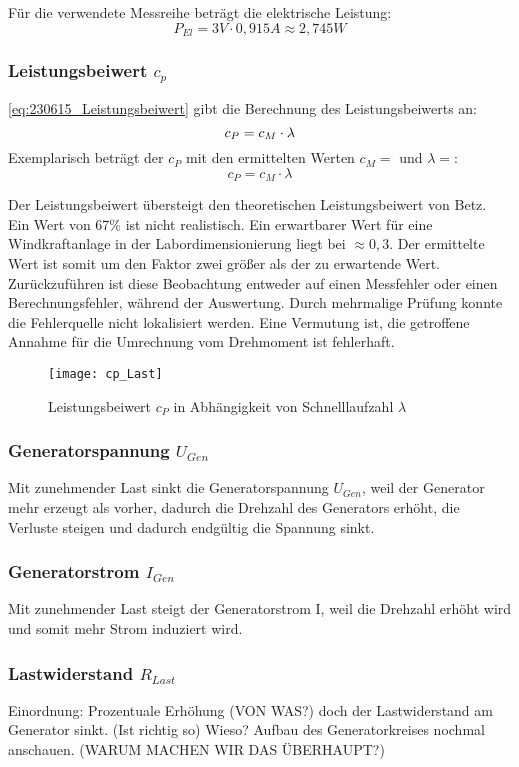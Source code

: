 Für die verwendete Messreihe beträgt die elektrische Leistung:
$$P_{El} = 3V \cdot 0,915A \approx 2,745W$$


\subsubsection*{Leistungsbeiwert $c_p$}
\autoref{eq:230615_Leistungsbeiwert} gibt die Berechnung des Leistungsbeiwerts an:
 \begin{equation}
     \centering
     c_P = c_M \cdot \lambda
     \label{eq:230615_Leistungsbeiwert}
 \end{equation}
Exemplarisch beträgt der $c_P$ mit den ermittelten Werten $c_M = $ und $\lambda =$:
 $$c_P = c_M \cdot \lambda$$

 Der Leistungsbeiwert übersteigt den theoretischen Leistungsbeiwert von Betz. Ein Wert von 67\% ist nicht realistisch. Ein erwartbarer Wert für eine Windkraftanlage in der Labordimensionierung liegt bei $\approx 0,3$. Der ermittelte Wert ist somit um den Faktor zwei größer als der zu erwartende Wert. Zurückzuführen ist diese Beobachtung entweder auf einen Messfehler oder einen Berechnungsfehler, während der Auswertung. Durch mehrmalige Prüfung konnte die Fehlerquelle nicht lokalisiert werden. Eine Vermutung ist, die getroffene Annahme für die Umrechnung vom Drehmoment ist fehlerhaft.
 \begin{figure}[H]
    \centering
    \texttt{[image: cp\_Last]}
    \caption{Leistungsbeiwert $c_P$ in Abhängigkeit von Schnelllaufzahl $\lambda$}
    \label{fig:cp_last}
\end{figure}
\subsubsection*{Generatorspannung $U_{Gen}$}
Mit zunehmender Last sinkt die Generatorspannung $U_{Gen}$, weil der Generator
mehr erzeugt als vorher, dadurch die Drehzahl des Generators erhöht, die Verluste
steigen und dadurch endgültig die Spannung sinkt. 
\subsubsection*{Generatorstrom $I_{Gen}$}
Mit zunehmender Last steigt der Generatorstrom I, weil die Drehzahl erhöht
wird und somit mehr Strom induziert wird.

\subsubsection*{Lastwiderstand $R_{Last}$}
Einordnung: Prozentuale Erhöhung (VON WAS?) doch der Lastwiderstand am Generator sinkt. (Ist richtig so) Wieso? Aufbau des Generatorkreises nochmal anschauen. (WARUM MACHEN WIR DAS ÜBERHAUPT?)
